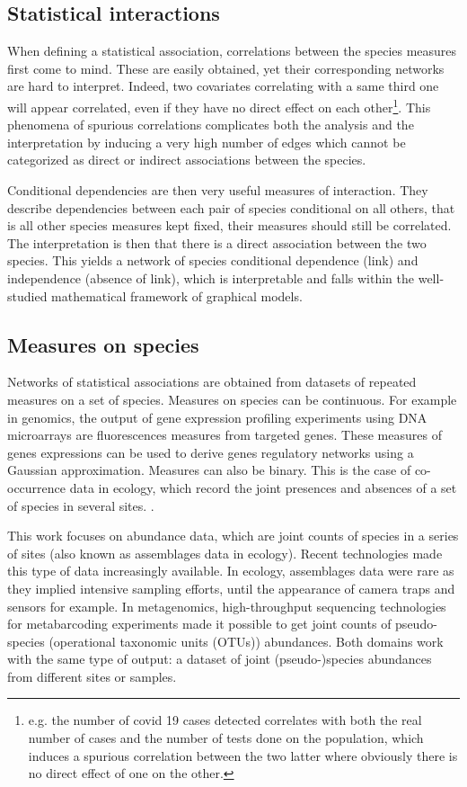   \subsection*{Statistical interactions}
When defining a statistical association, correlations between the species measures first come to mind. These are easily obtained, yet their corresponding networks are hard to interpret. Indeed, two covariates correlating with a same third one will appear correlated, even if they have no direct effect on each other\footnote{e.g. the number of covid 19 cases detected correlates with both the real number of cases and the number of tests done on the population, which induces a spurious correlation between the two latter where obviously there is no direct effect of one on the other.}. This phenomena of spurious correlations complicates both the analysis and the interpretation by inducing a very high number of edges  which cannot be categorized as direct or indirect associations between the species. 
 
 Conditional dependencies are then very useful measures of interaction. They describe dependencies between each pair of species conditional on all others, that is all other species measures kept fixed, their measures should still be correlated. The interpretation is then that there is a direct association between the two species. This yields a network of species conditional dependence (link) and independence (absence of link), which is interpretable and falls within the well-studied mathematical framework of graphical models.
 
 \subsection*{Measures on species}
 Networks of statistical associations are obtained from datasets of repeated measures on a set of species. Measures on species can be continuous. For example in genomics, the output of gene expression profiling experiments using DNA microarrays  are  fluorescences measures from targeted genes. These measures of genes expressions can be used to derive genes regulatory networks using a Gaussian approximation.  Measures can also be binary. This is the case of co-occurrence data in ecology, which record the joint presences and absences of a set of species in several sites. \citet{CAM16}.

This work focuses on abundance data, which are joint counts of species in a series of sites (also known as assemblages data in ecology). Recent technologies made this type of data increasingly available. In ecology, assemblages data were rare as they implied intensive sampling efforts, until the appearance of camera traps and sensors for example. In metagenomics, high-throughput sequencing technologies for metabarcoding experiments made it possible  to get joint counts of pseudo-species (operational taxonomic units (OTUs)) abundances.  Both domains work with the same type of output: a dataset of joint (pseudo-)species abundances from different sites or samples.\\

